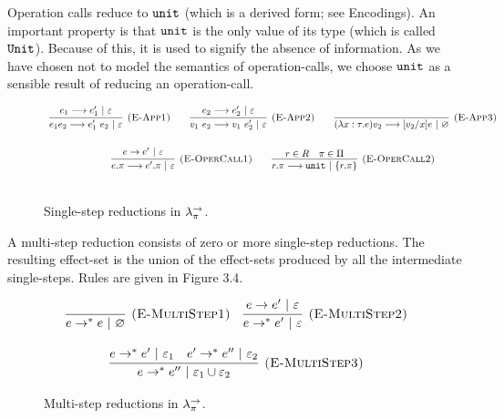 Operation calls reduce to $\mathtt{unit}$ (which is a derived form; see Encodings). An important property is that $\mathtt{unit}$ is the only value of its type (which is called $\mathtt{Unit}$). Because of this, it is used to signify the absence of information. As we have chosen not to model the semantics of operation-calls, we choose $\mathtt{unit}$ as a sensible result of reducing an operation-call. \\

\begin{figure}[h]

\noindent
{}

\[
\begin{array}{c}

\infer[\textsc{(E-App1)}]
	{e_1 e_2 \longrightarrow e_1'~ e_2~|~\varepsilon}
	{e_1 \longrightarrow e_1'~|~\varepsilon}
	~~~~~~
\infer[\textsc{(E-App2)}]
	{v_1 ~ e_2 \longrightarrow v_1 ~ e_2'~|~\varepsilon} 
	{e_2 \longrightarrow e_2'~|~\varepsilon}
~~~~~~
\infer[\textsc{(E-App3)}]
	{ (\lambda x: \tau. e) v_2 \longrightarrow [ v_2/x] e~|~\varnothing }
	{}\\[4ex]
	
\infer[\textsc{(E-OperCall1)}]
	{ e.\pi \longrightarrow  e'.\pi~|~\varepsilon }
	{ e \rightarrow  e'~|~\varepsilon}
		
	~~~~~~
	
\infer[\textsc{(E-OperCall2)}]
	{r.\pi \longrightarrow \kwa{unit}~|~\{ r.\pi \} }
	{r \in R & \pi \in \Pi}
	 \\[4ex]
	 
\end{array}
\]


\vspace{-7pt}
\caption{Single-step reductions in $\lambda^{\rightarrow}_{\pi}$.}
\label{This is the label.}
\end{figure}



A multi-step reduction consists of zero or more single-step reductions. The resulting effect-set is the union of the effect-sets produced by all the intermediate single-steps. Rules are given in Figure 3.4.

\begin{figure}[h]

\noindent
{}

\[
\begin{array}{c}

\infer[\textsc{(E-MultiStep1)}]
	{ e \rightarrow^{*}  e~|~\varnothing}
	{}
~~~
\infer[\textsc{(E-MultiStep2)}]
	{ e \rightarrow^{*}  e'~|~\varepsilon}
	{ e \rightarrow  e'~|~\varepsilon} \\[3ex]
	
\infer[\textsc{(E-MultiStep3)}]
	{ e \rightarrow^{*}  e''~|~\varepsilon_1 \cup \varepsilon_2}
	{ e \rightarrow^{*}  e'~|~\varepsilon_1 &  e' \rightarrow^{*}  e''~|~\varepsilon_2}
\end{array}
\]

\vspace{-7pt}
\caption{Multi-step reductions in $\lambda^{\rightarrow}_{\pi}$.}
\label{This is the label.}
\end{figure}


